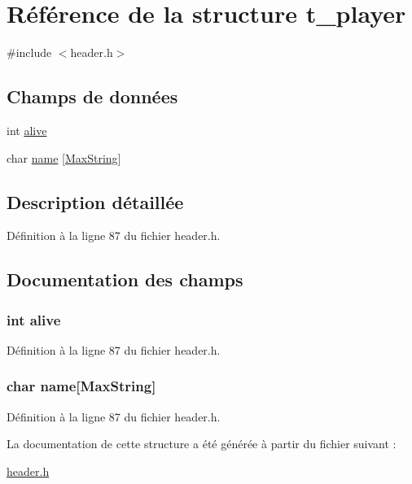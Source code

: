 \hypertarget{structt__player}{\section{Référence de la structure t\+\_\+player}
\label{structt__player}
}


{\ttfamily \#include $<$header.\+h$>$}

\subsection*{Champs de données}
\begin{DoxyCompactItemize}
\item 
int \hyperlink{structt__player_afaea7716a081e71f804e80c2d5a92390}{alive}
\item 
char \hyperlink{structt__player_ab27f28c5ead39031421706ddbbd1edea}{name} \mbox{[}\hyperlink{header_8h_ab154998a3a376095f3601bc35c5cf523}{Max\+String}\mbox{]}
\end{DoxyCompactItemize}


\subsection{Description détaillée}


Définition à la ligne 87 du fichier header.\+h.



\subsection{Documentation des champs}
\hypertarget{structt__player_afaea7716a081e71f804e80c2d5a92390}{
\subsubsection[{alive}]{\setlength{\rightskip}{0pt plus 5cm}int alive}}\label{structt__player_afaea7716a081e71f804e80c2d5a92390}


Définition à la ligne 87 du fichier header.\+h.

\hypertarget{structt__player_ab27f28c5ead39031421706ddbbd1edea}{
\subsubsection[{name}]{\setlength{\rightskip}{0pt plus 5cm}char name\mbox{[}{\bf Max\+String}\mbox{]}}}\label{structt__player_ab27f28c5ead39031421706ddbbd1edea}


Définition à la ligne 87 du fichier header.\+h.



La documentation de cette structure a été générée à partir du fichier suivant \+:\begin{DoxyCompactItemize}
\item 
\hyperlink{header_8h}{header.\+h}\end{DoxyCompactItemize}
